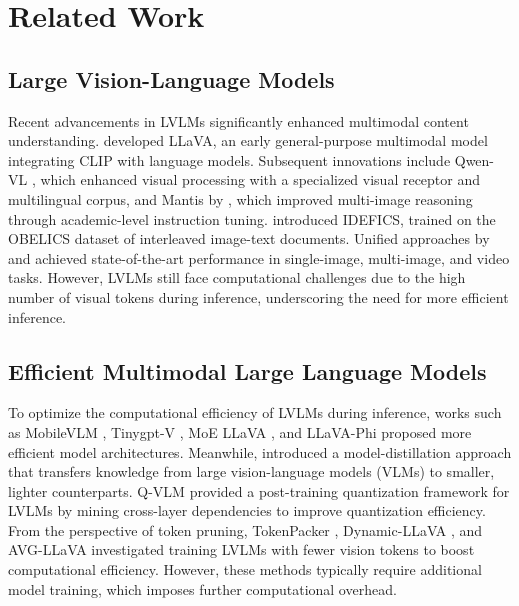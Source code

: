 \section{Related Work}
\label{sec::related}

\subsection{Large Vision-Language Models}\label{sec::relatedwork1}
Recent advancements in LVLMs significantly enhanced multimodal content understanding. \citet{liu2023llava} developed LLaVA, an early general-purpose multimodal model integrating CLIP \cite{radford2021learningtransferablevisualmodels} with language models. Subsequent innovations include Qwen-VL \cite{bai2023qwen,wang2024qwen2}, which enhanced visual processing with a specialized visual receptor and multilingual corpus, and Mantis by \citet{jiang2024mantis}, which improved multi-image reasoning through academic-level instruction tuning. \citet{laurenccon2024obelics} introduced IDEFICS, trained on the OBELICS dataset of interleaved image-text documents. Unified approaches by \citet{li2024llava-interleave} and \citet{li2024llava-onevision} achieved state-of-the-art performance in single-image, multi-image, and video tasks. However, LVLMs still face computational challenges due to the high number of visual tokens during inference, underscoring the need for more efficient inference.

\subsection{Efficient Multimodal Large Language Models}\label{sec::relatedwork2}
To optimize the computational efficiency of LVLMs during inference, works such as MobileVLM \cite{chu2023mobilevlm}, Tinygpt-V \cite{yuan2023tinygpt}, MoE LLaVA \cite{lin2024moe}, and LLaVA-Phi \cite{zhu2024llava} proposed more efficient model architectures. Meanwhile, \citet{li2023distilling} introduced a model-distillation approach that transfers knowledge from large vision-language models (VLMs) to smaller, lighter counterparts. Q-VLM \cite{wang2024q} provided a post-training quantization framework for LVLMs by mining cross-layer dependencies to improve quantization efficiency. From the perspective of token pruning, TokenPacker \cite{li2024tokenpacker}, Dynamic-LLaVA \cite{huang2024dynamic}, and AVG-LLaVA \cite{lan2024avg} investigated training LVLMs with fewer vision tokens to boost computational efficiency. However, these methods typically require additional model training, which imposes further computational overhead.

